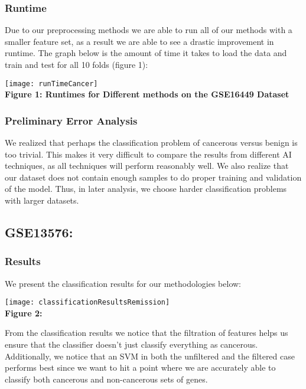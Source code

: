 \documentclass[12pt]{scrartcl}
\begin{document}
    
    
    
    \subsubsection{Runtime}
    Due to our preprocessing methods we are able to run all of our methods with a smaller feature set, as a result we are able to see a drastic improvement in runtime. The graph below is the amount of time it takes to load the data and train and test for all 10 folds (figure 1):
    
    \begin{center}
    \texttt{[image: runTimeCancer]}\\
    \textbf{Figure 1: Runtimes for Different methods on the GSE16449 Dataset}
    \end{center}
    
    \subsubsection{Preliminary Error Analysis}
    We realized that perhaps the classification problem of cancerous versus benign is too trivial. This makes it very difficult to compare the results from different AI techniques, as all techniques will perform reasonably well. We also realize that our dataset does not contain enough samples to do proper training and validation of the model. Thus, in later analysis, we choose harder classification problems with larger datasets.
    
    \subsection{GSE13576: }
    
    \subsubsection{Results}
	We present the classification results for our methodologies below:
    
    \begin{center}
    \texttt{[image: classificationResultsRemission]}\\
    \textbf{Figure 2:}
    \end{center}
   
  	From the classification results we notice that the filtration of features helps us ensure that the classifier doesn't just classify everything as cancerous. Additionally, we notice that an SVM in both the unfiltered and the filtered case performs best since we want to hit a point where we are accurately able to classify both cancerous and non-cancerous sets of genes.  
   
\end{document}
